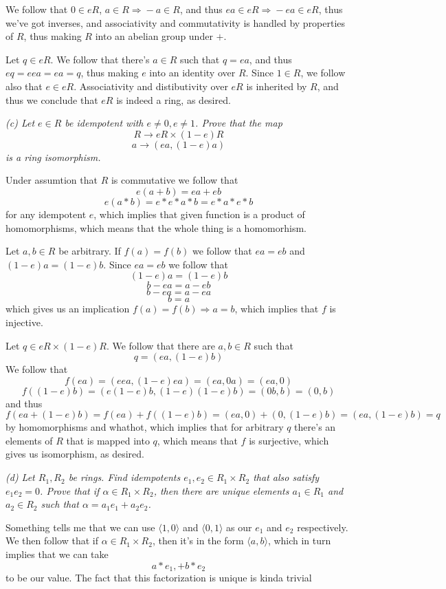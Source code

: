 \documentclass[11pt,oneside,titlepage]{book}
\DeclareMathOperator \ra {\Rightarrow}
\newcommand{\eangle}[1]{\langle #1 \rangle}
\begin{document}
We follow that $0 \in eR$, $a \in R \ra -a \in R$, and thus $ea \in eR
\ra -ea \in eR$, thus we've got inverses, and associativity and
commutativity is handled by properties of $R$, thus making $R$ into an
abelian group under $+$.

Let $q \in eR$. We follow that there's $a \in R$ such that $q = ea$,
and thus $eq = eea = ea = q$, thus making $e$ into an identity over
$R$. Since $1 \in R$, we follow also that $e \in eR$. Associativity
and distibutivity over $eR$ is inherited by $R$, and thus we conclude
that $eR$ is indeed a ring, as desired.

\textit{(c) Let $e \in R$ be idempotent with $e \neq 0, e \neq
1$. Prove that the map
  $$R \to eR \times (1 - e)R$$
  $$a \to (ea, (1 - e)a)$$
  is a ring isomorphism.}

Under assumtion that $R$ is commutative we follow that
$$ e (a + b) = e a + eb $$
$$ e (a * b) = e * e * a * b = e * a * e * b $$
for any idempotent $e$, which implies that given function is a product
of homomorphisms, which means that the whole thing is a homomorhism.

Let $a, b \in R$ be arbitrary.  If $f(a) = f(b)$ we follow that $ea =
eb$ and $(1 - e)a = (1 - e)b$.  Since $ea = eb$ we follow that
$$(1 - e)a = (1 - e)b$$
$$b - ea = a - eb$$
$$b - ea = a - ea$$
$$b = a$$
which gives us an implication $f(a) = f(b) \ra a = b$, which implies
that $f$ is injective.

Let $q \in eR \times (1 - e)R$. We follow that there are $a, b \in R$
such that
$$q = (ea, (1 - e)b)$$
We follow that
$$f(ea) = (eea, (1 - e)ea) = (ea, 0a) = (ea, 0)$$
$$f((1 - e)b) = (e(1 - e)b, (1 - e)(1 - e)b) = (0 b, b) = (0, b)$$
and thus
$$f(ea + (1 - e)b) = f(ea) + f((1 - e)b)
= (ea, 0) + (0, (1 - e)b) = (ea, (1 - e)b) = q$$ by homomorphisms and
whathot, which implies that for arbitrary $q$ there's an elements of
$R$ that is mapped into $q$, which means that $f$ is surjective, which
gives us isomorphism, as desired.

\textit{(d) Let $R_1, R_2$ be rings. Find idempotents $e_1, e_2 \in
R_1 \times R_2$ that also satisfy $e_1 e_2 = 0$. Prove that if $\alpha
\in R_1 \times R_2$, then there are unique elements $a_1 \in R_1$ and
$a_2 \in R_2$ such that $\alpha = a_1 e_1 + a_2 e_2$.}

Something tells me that we can use $\eangle{1, 0}$ and $\eangle{0, 1}$
as our $e_1$ and $e_2$ respectively. We then follow that if $\alpha
\in R_1 \times R_2$, then it's in the form $\eangle{a,b}$, which in
turn implies that we can take
$$a * e_1, + b * e_2$$
to be our value. The fact that this factorization is unique is kinda
trivial
\end{document}
